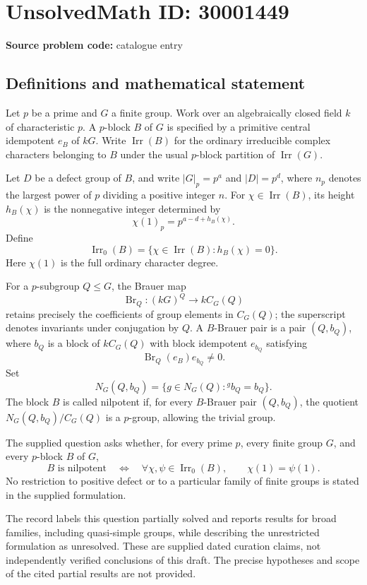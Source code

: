 \documentclass[11pt]{article}
\begin{document}
\section*{UnsolvedMath ID: 30001449}
\textbf{Source problem code:} catalogue entry
\subsection{Definitions and mathematical statement}
Let \(p\) be a prime and \(G\) a finite group. Work over an algebraically closed field \(k\) of characteristic \(p\). A \(p\)-block \(B\) of \(G\) is specified by a primitive central idempotent \(e_B\) of \(kG\). Write \(\operatorname{Irr}(B)\) for the ordinary irreducible complex characters belonging to \(B\) under the usual \(p\)-block partition of \(\operatorname{Irr}(G)\).

Let \(D\) be a defect group of \(B\), and write \(|G|_p=p^a\) and \(|D|=p^d\), where \(n_p\) denotes the largest power of \(p\) dividing a positive integer \(n\). For \(\chi\in\operatorname{Irr}(B)\), its height \(h_B(\chi)\) is the nonnegative integer determined by
\[
\chi(1)_p=p^{a-d+h_B(\chi)}.
\]
Define
\[
\operatorname{Irr}_0(B)=\{\chi\in\operatorname{Irr}(B):h_B(\chi)=0\}.
\]
Here \(\chi(1)\) is the full ordinary character degree.

For a \(p\)-subgroup \(Q\leq G\), the Brauer map
\[
\operatorname{Br}_Q:(kG)^Q\longrightarrow kC_G(Q)
\]
retains precisely the coefficients of group elements in \(C_G(Q)\); the superscript denotes invariants under conjugation by \(Q\). A \(B\)-Brauer pair is a pair \((Q,b_Q)\), where \(b_Q\) is a block of \(kC_G(Q)\) with block idempotent \(e_{b_Q}\) satisfying
\[
\operatorname{Br}_Q(e_B)e_{b_Q}\ne 0.
\]
Set
\[
N_G(Q,b_Q)=\{g\in N_G(Q):{}^g b_Q=b_Q\}.
\]
The block \(B\) is called nilpotent if, for every \(B\)-Brauer pair \((Q,b_Q)\), the quotient \(N_G(Q,b_Q)/C_G(Q)\) is a \(p\)-group, allowing the trivial group.

The supplied question asks whether, for every prime \(p\), every finite group \(G\), and every \(p\)-block \(B\) of \(G\),
\[
B\text{ is nilpotent}
\quad\Longleftrightarrow\quad
\forall\chi,\psi\in\operatorname{Irr}_0(B),\qquad \chi(1)=\psi(1).
\]
No restriction to positive defect or to a particular family of finite groups is stated in the supplied formulation.

The record labels this question partially solved and reports results for broad families, including quasi-simple groups, while describing the unrestricted formulation as unresolved. These are supplied dated curation claims, not independently verified conclusions of this draft. The precise hypotheses and scope of the cited partial results are not provided.
\end{document}
